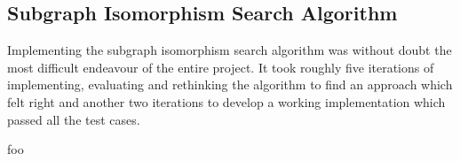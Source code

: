 
\subsection{Subgraph Isomorphism Search Algorithm}
\label{sec:subgraph_isomorphism_search_algorithm}

Implementing the subgraph isomorphism search algorithm was without doubt the most difficult endeavour of the entire project. It took roughly five iterations of implementing, evaluating and rethinking the algorithm to find an approach which felt right and another two iterations to develop a working implementation which passed all the test cases.

foo


